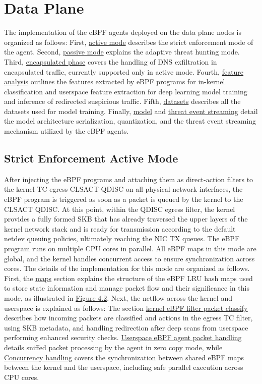 \documentclass [11pt, proquest] {uwthesis}[2020/02/24]
\begin{document}
\section{Data Plane}
The implementation of the eBPF agents deployed on the data plane nodes is organized as follows: First, \hyperref[sec:active]{active mode} describes the strict enforcement mode of the agent. Second, \hyperref[sec:passive]{passive mode} explains the adaptive threat hunting mode. Third, \hyperref[sec:encap]{encapsulated phase} covers the handling of DNS exfiltration in encapsulated traffic, currently supported only in active mode. Fourth, \hyperref[sec:features]{feature analysis} outlines the features extracted by eBPF programs for in-kernel classification and userspace feature extraction for deep learning model training and inference of redirected suspicious traffic. Fifth, \hyperref[sec:dataset]{datasets} describes all the datasets used for model training. Finally, \hyperref[sec:model]{model} and \hyperref[sec:threat-event-streaming]{threat event streaming} detail the model architecture serialization, quantization, and the threat event streaming mechanism utilized by the eBPF agents.

\subsection{Strict Enforcement Active Mode}
\label{sec:active}
After injecting the eBPF programs and attaching them as direct-action filters to the kernel TC egress CLSACT QDISC on all physical network interfaces, the eBPF program is triggered as soon as a packet is queued by the kernel to the CLSACT QDISC. At this point, within the QDISC egress filter, the kernel provides a fully formed SKB that has already traversed the upper layers of the kernel network stack and is ready for transmission according to the default netdev queuing policies, ultimately reaching the NIC TX queues. The eBPF program runs on multiple CPU cores in parallel. All eBPF maps in this mode are global, and the kernel handles concurrent access to ensure synchronization across cores. The details of the implementation for this mode are organized as follows. First, the \hyperref[sec:dp_eBPF_LRU_Maps_active]{maps} section explains the structure of the eBPF LRU hash maps used to store state information and manage packet flow and their significance in this mode, as illustrated in \hyperref[sec:dp_eBPF_LRU_Maps_active]{Figure 4.2}. Next, the netflow across the kernel and userspace is explained as follows:
The section \hyperref[active:sec1]{kernel eBPF filter packet classify} describes how incoming packets are classified and actions in the egress TC filter, using SKB metadata, and handling redirection after deep scans from userspace performing enhanced security checks. \hyperref[active:sec3]{Userspace eBPF agent packet handling} details sniffed packet processing by the agent in zero copy mode, while \hyperref[active:sec3]{Concurrency handling} covers the synchronization between shared eBPF maps between the kernel and the userspace, including safe parallel execution across CPU cores.
\end{document}
